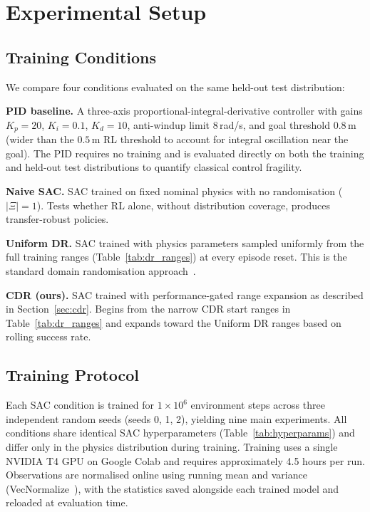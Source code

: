 
\section{Experimental Setup}
\label{sec:experiments}

\subsection{Training Conditions}

We compare four conditions evaluated on the same held-out test distribution:

\textbf{PID baseline.}
A three-axis proportional-integral-derivative controller with gains
$K_p = 20$, $K_i = 0.1$, $K_d = 10$, anti-windup limit $8$\,rad/s,
and goal threshold $0.8$\,m (wider than the $0.5$\,m RL threshold
to account for integral oscillation near the goal).
The PID requires no training and is evaluated directly on both the
training and held-out test distributions to quantify classical control
fragility.

\textbf{Naive SAC.}
SAC trained on fixed nominal physics with no randomisation ($|\Xi| = 1$).
Tests whether RL alone, without distribution coverage, produces
transfer-robust policies.

\textbf{Uniform DR.}
SAC trained with physics parameters sampled uniformly from the full
training ranges (Table~\ref{tab:dr_ranges}) at every episode reset.
This is the standard domain randomisation approach~\cite{tobin2017domain}.

\textbf{CDR (ours).}
SAC trained with performance-gated range expansion as described in
Section~\ref{sec:cdr}. Begins from the narrow CDR start ranges in
Table~\ref{tab:dr_ranges} and expands toward the Uniform DR ranges
based on rolling success rate.

\subsection{Training Protocol}

Each SAC condition is trained for $1 \times 10^6$ environment steps
across three independent random seeds (seeds 0, 1, 2), yielding nine
main experiments.
All conditions share identical SAC hyperparameters (Table~\ref{tab:hyperparams})
and differ only in the physics distribution during training.
Training uses a single NVIDIA T4 GPU on Google Colab and requires
approximately 4.5 hours per run.
Observations are normalised online using running mean and variance
(VecNormalize~\cite{stable_baselines3}), with the statistics saved
alongside each trained model and reloaded at evaluation time.

